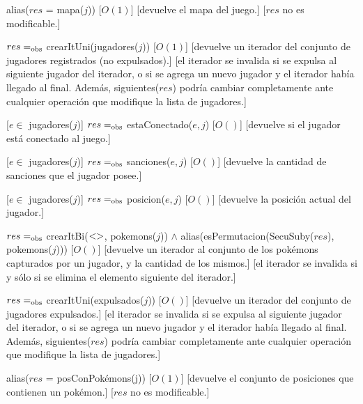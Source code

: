\begin{Interfaz}
	{alias($res$ = mapa($j$))}
	[$O(1)$]
	[devuelve el mapa del juego.]
	[$res$ no es modificable.]

	{$res =_{\mathrm{obs}}$ crearItUni(jugadores($j$))}
	[$O(1)$]
	[devuelve un iterador del conjunto de jugadores registrados (no expulsados).]
	[el iterador se invalida si se expulsa al siguiente jugador del iterador, o si se agrega un nuevo jugador y el iterador había llegado al final. Además, siguientes($res$) podría cambiar completamente ante cualquier operación que modifique la lista de jugadores.]

	[$e \in$ jugadores($j$)]
	{$res =_{\mathrm{obs}}$ estaConectado($e, j$)}
	[$O()$]
	[devuelve si el jugador está conectado al juego.]

	[$e \in$ jugadores($j$)]
	{$res =_{\mathrm{obs}}$ sanciones($e, j$)}
	[$O()$]
	[devuelve la cantidad de sanciones que el jugador posee.]

	[$e \in$ jugadores($j$)]
	{$res =_{\mathrm{obs}}$ posicion($e, j$)}
	[$O()$]
	[devuelve la posición actual del jugador.]

	{$res =_{\mathrm{obs}}$ crearItBi($<>$, pokemons($j$)) $\land$ alias(esPermutacion(SecuSuby($res$), pokemons($j$)))}
	[$O()$]
	[devuelve un iterador al conjunto de los pokémons capturados por un jugador, y la cantidad de los mismos.]
	[el iterador se invalida si y sólo si se elimina el elemento siguiente del iterador.]

	{$res =_{\mathrm{obs}}$ crearItUni(expulsados($j$))}
	[$O()$]
	[devuelve un iterador del conjunto de jugadores expulsados.]
	[el iterador se invalida si se expulsa al siguiente jugador del iterador, o si se agrega un nuevo jugador y el iterador había llegado al final. Además, siguientes($res$) podría cambiar completamente ante cualquier operación que modifique la lista de jugadores.]

	{alias($res$ = posConPokémons(j))}
	[$O(1)$]
	[devuelve el conjunto de posiciones que contienen un pokémon.]
	[$res$ no es modificable.]


\end{Interfaz}
